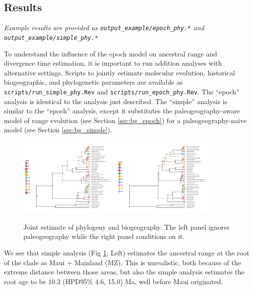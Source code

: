 \subsection*{Results}

{\it Example results are provided as {\tt output\_example/epoch\_phy.*} and {\tt output\_example/simple\_phy.*} }

To understand the influence of the epoch model on ancestral range and divergence time estimation, it is important to run addition analyses with alternative settings.
Scripts to jointly estimate molecular evolution, historical biogeographic, and phylogenetic parameters are available as {\tt scripts/run\_simple\_phy.Rev} and {\tt scripts/run\_epoch\_phy.Rev}.
The ``epoch'' analysis is identical to the analysis just described.
The ``simple'' analysis is similar to the ``epoch'' analysis, except it substitutes the paleogeography-aware model of range evolution (see Section \ref{sec:bg_epoch}) for a paleogeography-naive model (see Section \ref{sec:bg_simple}).

\begin{figure}[!ht]
\centering
\includegraphics[width=0.45\textwidth]{figures/fig_simple_phy_RevGadgets_ase.pdf}\includegraphics[width=0.45\textwidth]{figures/fig_epoch_phy_RevGadgets_ase.pdf} 
\caption{Joint estimate of phylogeny and biogeography. The left panel ignores paleogeography while the right panel conditions on it.}
\label{fig:epoch_phy}
\end{figure}

We see that simple analysis (Fig \ref{fig:epoch_phy}, Left) estimates the ancestral range at the root of the clade as Maui + Mainland (MZ).
This is unrealistic, both because of the extreme distance between those areas, but also the simple analysis estimates the root age to be 10.3 (HPD95\% 4.6, 15.0) Ma, well before Maui originated.

